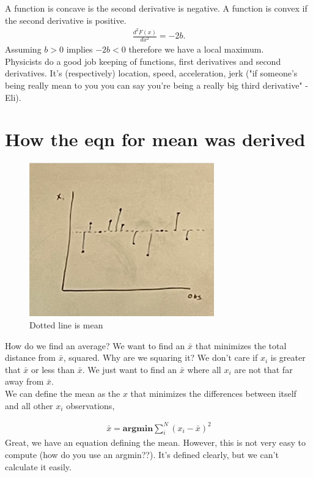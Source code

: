 \documentclass{article}
\begin{document}
A function is concave is the second derivative is negative. A function is convex if the second derivative is positive.\\

\begin{align}
    \frac{d^2F(x)}{dx^2} = -2b.
\end{align}
Assuming $b>0$ implies $-2b<0$ therefore we have a local maximum. \\

Physicists do a good job keeping of functions, first derivatives and second derivatives. It's (respectively) location, speed, acceleration, jerk ("if someone's being really mean to you you can say you're being a really big third derivative" - Eli). 

\section{How the eqn for mean was derived}

\begin{figure}[htp]
    \centering
    \includegraphics[width=8cm]{mean_pic.png}
    \caption{Dotted line is mean}
\end{figure}

How do we find an average? We want to find an $\bar x$ that minimizes the total distance from $\bar x$, squared. Why are we squaring it? We don't care if $x_i$ is greater that $\bar x$ or less than $\bar x$. We just want to find an $\bar x$ where all $x_i$ are not that far away from $\bar x$. \\

We can define the mean as the $x$ that minimizes the differences between itself and all other $x_i$ observations,

\begin{align} 
    \bar x = \textbf{argmin} \sum_i^N (x_i - \bar x) ^2
\end{align}
Great, we have an equation defining the mean. However, this is not very easy to compute (how do you use an argmin??). It's defined clearly, but we can't calculate it easily. \\
\end{document}
